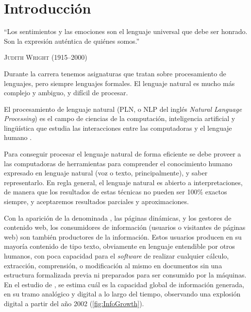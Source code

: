 
\chapter{Introducción}

\epigraph{``Los sentimientos y las emociones son el lenguaje universal que debe ser honrado. Son la expresión auténtica de quiénes somos.''}{\textsc{Judith Wright} (1915--2000)}

Durante la carrera tenemos asignaturas que tratan sobre procesamiento de lenguajes, pero siempre lenguajes formales. El lenguaje natural es mucho más complejo y ambiguo, y difícil de procesar.

\begin{definition}[NLP]
El procesamiento de lenguaje natural (PLN, o NLP del inglés \emph{Natural Language Processing}) es el campo de ciencias de la computación, inteligencia artificial y lingüística que estudia las interacciones entre las computadoras y el lenguaje humano \citep[Procesamiento de lenguajes naturales]{wikipedia-es}.
\end{definition}

Para conseguir procesar el lenguaje natural de forma eficiente se debe proveer a las computadoras de herramientas para comprender el conocimiento humano expresado en lenguaje natural (voz o texto, principalmente), y saber representarlo. En regla general, el lenguaje natural es abierto a interpretaciones, de manera que los resultados de estas técnicas no pueden ser 100\% exactos siempre, y aceptaremos resultados parciales y aproximaciones.

Con la aparición de la denominada , las páginas dinámicas, y los gestores de contenido web, los consumidores de información (usuarios o visitantes de páginas web) son también productores de la información. Estos usuarios producen en su mayoría contenido de tipo texto, obviamente en lenguaje entendible por otros humanos, con poca capacidad para el \emph{software} de realizar cualquier cálculo, extracción, comprensión, o modificación al mismo en documentos sin una estructura formalizada previa ni preparados para ser consumido por la máquinas. En el estudio de \citet{Hilbert2011}, se estima cuál es la capacidad global de información generada, en su tramo analógico y digital a lo largo del tiempo, observando una explosión digital a partir del año 2002 (\autoref{fig:InfoGrowth}).

